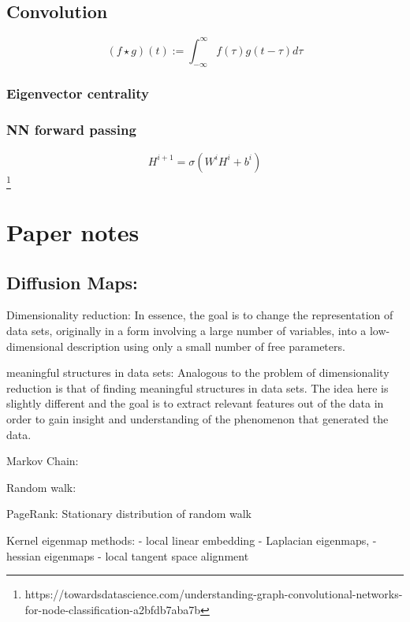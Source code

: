 \section{Convolution}
\begin{equation}
    (f \star g)(t) := \int_{-\infty}^{\infty} f(\tau) g(t - \tau) d\tau
\end{equation}

\subsection{Eigenvector centrality}
\subsection{NN forward passing}
\begin{equation}
    H^{i + 1} = \sigma ( W^i H ^i + b^i) 
\end{equation}
\footnote{https://towardsdatascience.com/understanding-graph-convolutional-networks-for-node-classification-a2bfdb7aba7b}

\chapter{Paper notes}

\section{Diffusion Maps:}
\citet{diffusionMaps}
\cite{diffusionMaps}

Dimensionality reduction:
In essence, the goal is to change the representation of data sets, originally in a form involving a large number of variables, into a
low-dimensional description using only a small number of free parameters.

meaningful structures in data sets:
Analogous to the problem of dimensionality reduction is that of finding meaningful structures in data sets. The idea here is slightly
different and the goal is to extract relevant features out of the data in order to gain insight and understanding of the
phenomenon that generated the data.

Markov Chain:

Random walk:

PageRank:
Stationary distribution of random walk

Kernel eigenmap methods:
- local linear embedding
- Laplacian eigenmaps,
- hessian eigenmaps
- local tangent space alignment

